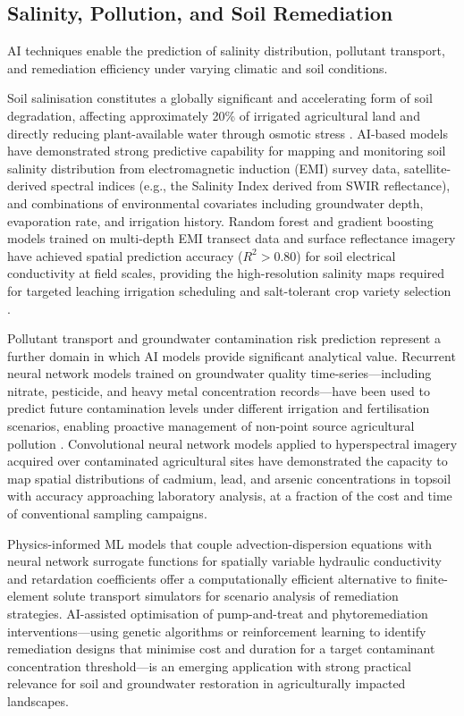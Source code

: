 \documentclass[land,article,submit,pdftex,moreauthors]{Definitions/mdpi}
\numberwithin{equation}{section}
\begin{document}
\subsection{Salinity, Pollution, and Soil Remediation}

AI techniques enable the prediction of salinity distribution, pollutant transport, and remediation efficiency under varying climatic and soil conditions.

Soil salinisation constitutes a globally significant and accelerating form of soil degradation, affecting approximately 20\% of irrigated agricultural land and directly reducing plant-available water through osmotic stress \citep{nachshon2018cropland}. AI-based models have demonstrated strong predictive capability for mapping and monitoring soil salinity distribution from electromagnetic induction (EMI) survey data, satellite-derived spectral indices (e.g., the Salinity Index derived from SWIR reflectance), and combinations of environmental covariates including groundwater depth, evaporation rate, and irrigation history. Random forest and gradient boosting models trained on multi-depth EMI transect data and surface reflectance imagery have achieved spatial prediction accuracy ($R^2 > 0.80$) for soil electrical conductivity at field scales, providing the high-resolution salinity maps required for targeted leaching irrigation scheduling and salt-tolerant crop variety selection \citep{Lemenkova202515}.

Pollutant transport and groundwater contamination risk prediction represent a further domain in which AI models provide significant analytical value. Recurrent neural network models trained on groundwater quality time-series---including nitrate, pesticide, and heavy metal concentration records---have been used to predict future contamination levels under different irrigation and fertilisation scenarios, enabling proactive management of non-point source agricultural pollution \citep{rahmati2019groundwater, Lemenkova202214, Lemenkova202233}. Convolutional neural network models applied to hyperspectral imagery acquired over contaminated agricultural sites have demonstrated the capacity to map spatial distributions of cadmium, lead, and arsenic concentrations in topsoil with accuracy approaching laboratory analysis, at a fraction of the cost and time of conventional sampling campaigns. 

Physics-informed ML models that couple advection-dispersion equations with neural network surrogate functions for spatially variable hydraulic conductivity and retardation coefficients offer a computationally efficient alternative to finite-element solute transport simulators for scenario analysis of remediation strategies. AI-assisted optimisation of pump-and-treat and phytoremediation interventions---using genetic algorithms or reinforcement learning to identify remediation designs that minimise cost and duration for a target contaminant concentration threshold---is an emerging application with strong practical relevance for soil and groundwater restoration in agriculturally impacted landscapes.
\end{document}

